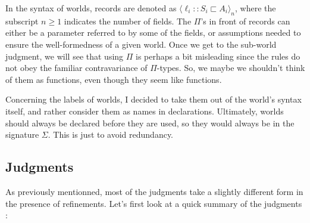 \documentclass[letterpaper, 11pt]{article}
\begin{document}
    In the syntax of worlds, records are denoted as $\langle \ell_i {::} S_i \sqsubset A_i \rangle_n$, where the subscript $n \geq 1$ indicates the 
    number of fields.  The $\Pi$'s in front of records can either be a parameter referred to by some of the fields, or assumptions needed to ensure
    the well-formedness of a given world.  Once we get to the sub-world judgment, we will see that using $\Pi$ is perhaps a bit misleading since the
    rules do not obey the familiar contravariance of $\Pi$-types.  So, we maybe we shouldn't think of them as functions, even though they seem like functions.

    Concerning the labels of worlds, I decided to take them out of the world's syntax itself, and rather consider them as names in declarations.  
    Ultimately, worlds should always be declared before they are used, so they would always be in the signature $\Sigma$.  This is just to avoid redundancy.

    \subsection{Judgments}
    As previously mentionned, most of the judgments take a slightly different form in the presence of refinements.  Let's first look at a 
    quick summary of the judgments :
\end{document}

